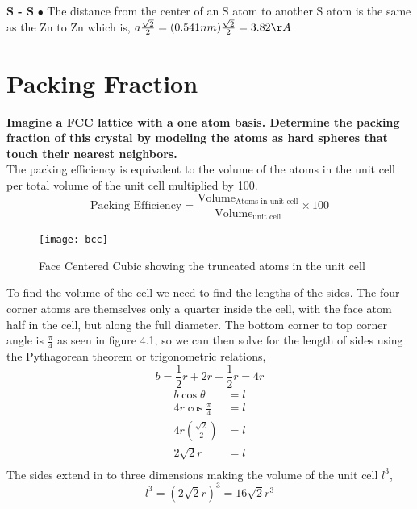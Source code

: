 \documentclass[paper=a4, fontsize=11pt]{scrartcl} %
\numberwithin{equation}{section} %
\numberwithin{figure}{section} %
\numberwithin{table}{section} %
\begin{document}
\textbf{S - S} $ \bullet$ The distance from the center of an S atom to another S atom is the same as the Zn to Zn which is,  $a\frac{\sqrt{2}}{2} = (0.541nm)\frac{\sqrt{2}}{2} = 3.82\AA$
 
\section{Packing Fraction}
\textbf{Imagine a FCC lattice with a one atom basis. Determine the packing fraction of this crystal by modeling the atoms as hard spheres that touch their nearest neighbors.}\\

The packing efficiency is equivalent to the volume of the atoms in the unit cell per total volume of the unit cell multiplied by 100.
\begin{equation*}
\text{Packing Efficiency} = \frac{\text{Volume}_{\text{Atoms  in  unit cell}}}{\text{Volume}_{\text{unit cell}}} \times 100
\end{equation*}

\begin{figure}[h]
\texttt{[image: bcc]}
\centering
\caption{Face Centered Cubic showing the truncated atoms in the unit cell}
\end{figure}

 To find the volume of the cell we need to find the lengths of the sides. The four corner atoms are themselves only a quarter inside the cell, with the face atom half in the cell, but along the full diameter. The bottom corner to top corner angle is $\frac{\pi}{4}$ as seen in figure 4.1, so we can then solve for the length of sides using the Pythagorean theorem or trigonometric relations,
 \begin{equation*}
 b = \frac{1}{2}r + 2r + \frac{1}{2}r = 4r
 \end{equation*}
\begin{equation*} 
\begin{split}
b \cos{\theta} & = l \\
 4r \cos{\frac{\pi}{4}}& = l \\
 4r(\frac{\sqrt{2}}{2}) & = l \\
 2\sqrt{2} r & = l \\
\end{split}
\end{equation*}
The sides extend in to three dimensions making the volume of the unit cell $l^3$,
\begin{equation*}
l^3 = (2\sqrt{2}r)^3 = 16 \sqrt{2} r^3
\end{equation*}
\end{document}
